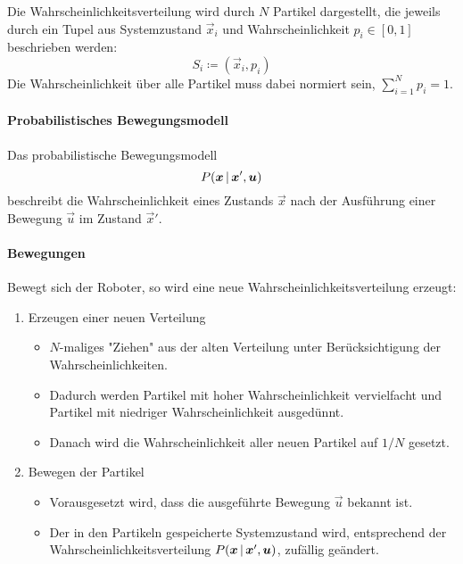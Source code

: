 				Die Wahrscheinlichkeitsverteilung wird durch \(N\) Partikel dargestellt, die jeweils durch ein Tupel aus Systemzustand \( \vec{x}_i \) und Wahrscheinlichkeit \( p_i \in [0, 1] \) beschrieben werden:
				\begin{equation*}
					S_i \coloneqq (\vec{x}_i, p_i)
				\end{equation*}
				Die Wahrscheinlichkeit über alle Partikel muss dabei normiert sein, \dh \( \sum_{i = 1}^{N} p_i = 1 \).

				\paragraph{Probabilistisches Bewegungsmodell}
					Das probabilistische Bewegungsmodell
					\begin{equation*}
						P(\bm{x} \,\vert\, \bm{x}', \bm{u})
					\end{equation*}
					beschreibt die Wahrscheinlichkeit eines Zustands \( \vec{x} \) nach der Ausführung einer Bewegung \( \vec{u} \) im Zustand \( \vec{x}' \).

				\paragraph{Bewegungen}
					Bewegt sich der Roboter, so wird eine neue Wahrscheinlichkeitsverteilung erzeugt:
					\begin{enumerate}
						\item Erzeugen einer neuen Verteilung
							\begin{itemize}
								\item \(N\)-maliges "Ziehen" aus der alten Verteilung unter Berücksichtigung der Wahrscheinlichkeiten.
								\item Dadurch werden Partikel mit hoher Wahrscheinlichkeit vervielfacht und Partikel mit niedriger Wahrscheinlichkeit ausgedünnt.
								\item Danach wird die Wahrscheinlichkeit aller neuen Partikel auf \( 1/N \) gesetzt.
							\end{itemize}
						\item Bewegen der Partikel
							\begin{itemize}
								\item Vorausgesetzt wird, dass die ausgeführte Bewegung \( \vec{u} \) bekannt ist.
								\item Der in den Partikeln gespeicherte Systemzustand wird, entsprechend der Wahrscheinlichkeitsverteilung \( P(\bm{x} \,\vert\, \bm{x}', \bm{u}) \), zufällig geändert.
							\end{itemize}
					\end{enumerate}

